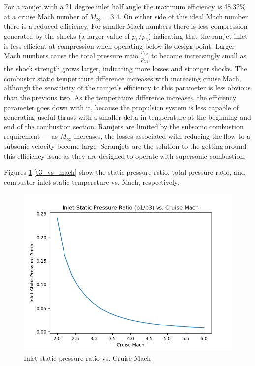 \documentclass[../main.tex]{subfiles}
\begin{document}
\discussion{}
For a ramjet with a 21 degree inlet half angle the maximum efficiency is 48.32\% at a cruise Mach number of \(M_\infty=3.4\).
On either side of this ideal Mach number there is a reduced efficiency.
For smaller Mach numbers there is less compression generated by the shocks (a larger value of \(p_1/p_3\)) indicating that the ramjet inlet is less efficient at compression when operating below its design point. 
Larger Mach numbers cause the total pressure ratio \(\frac{p_{t,3}}{p_{t,1}}\) to become increasingly small as the shock strength grows larger, indicating more losses and stronger shocks.
The combustor static temperature difference increases with increasing cruise Mach, although the sensitivity of the ramjet's efficiency to this parameter is less obvious than the previous two.
As the temperature difference increases, the efficiency parameter goes down with it, because the propulsion system is less capable of generating useful thrust with a smaller delta in temperature at the beginning and end of the combustion section.
Ramjets are limited by the subsonic combustion requirement --- as \(M_\infty\) increases, the losses associated with reducing the flow to a subsonic velocity become large.
Scramjets are the solution to the getting around this efficiency issue as they are designed to operate with supersonic combustion.

Figures \ref{pr_vs_mach}-\ref{t3_vs_mach} show the static pressure ratio, total pressure ratio, and combustor inlet static temperature vs. Mach, respectively. 

\begin{figure}[h!]
    \centering
    \includegraphics[scale=0.6]{../../images/problem_2/pr_vs_mach.png}
    \caption{Inlet static pressure ratio vs. Cruise Mach}
    \label{pr_vs_mach}
\end{figure}
\end{document}

